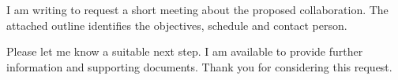I am writing to request a short meeting about the proposed collaboration. The attached outline identifies the objectives, schedule and contact person.

Please let me know a suitable next step. I am available to provide further information and supporting documents. Thank you for considering this request.
